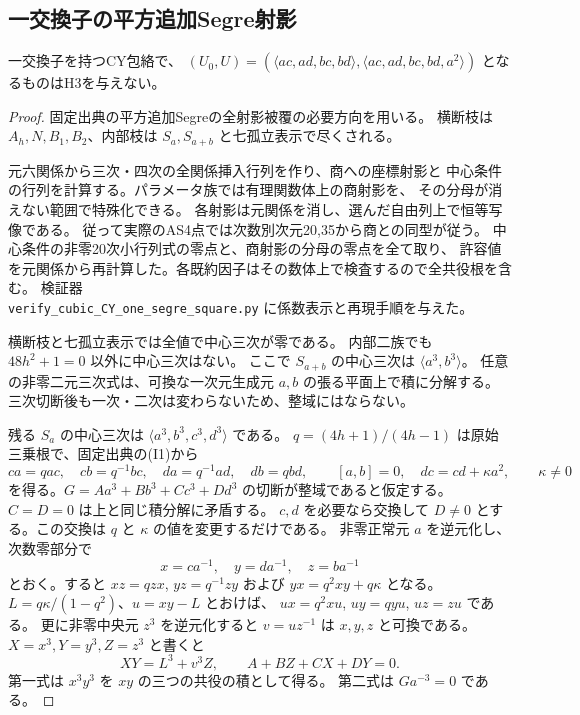 \subsection{一交換子の平方追加Segre射影}
\begin{proposition}\label{prop:cubic-CY-one-segre-square-empty}
一交換子を持つCY包絡で、
$(U_0,U)=(\langle ac,ad,bc,bd\rangle,\langle ac,ad,bc,bd,a^2\rangle)$
となるものはH3を与えない。
\end{proposition}
\begin{proof}
固定出典\cite{AS4CYpinned}の平方追加Segreの全射影被覆の必要方向を用いる。
横断枝は $A_h,N,B_1,B_2$、内部枝は $S_a,S_{a+b}$ と七孤立表示で尽くされる。

元六関係から三次・四次の全関係挿入行列を作り、商への座標射影と
中心条件の行列を計算する。パラメータ族では有理関数体上の商射影を、
その分母が消えない範囲で特殊化できる。
各射影は元関係を消し、選んだ自由列上で恒等写像である。
従って実際のAS4点では次数別次元20,35から商との同型が従う。
中心条件の非零20次小行列式の零点と、商射影の分母の零点を全て取り、
許容値を元関係から再計算した。各既約因子はその数体上で検査するので全共役根を含む。
検証器\\
\texttt{verify\_cubic\_CY\_one\_segre\_square.py}\quad
に係数表示と再現手順を与えた。

横断枝と七孤立表示では全値で中心三次が零である。
内部二族でも $48h^2+1=0$ 以外に中心三次はない。
ここで $S_{a+b}$ の中心三次は $\langle a^3,b^3\rangle$。
任意の非零二元三次式は、可換な一次元生成元 $a,b$ の張る平面上で積に分解する。
三次切断後も一次・二次は変わらないため、整域にはならない。

残る $S_a$ の中心三次は $\langle a^3,b^3,c^3,d^3\rangle$ である。
$q=(4h+1)/(4h-1)$ は原始三乗根で、固定出典の(I1)から
\[
 ca=qac,\quad cb=q^{-1}bc,\quad da=q^{-1}ad,\quad db=qbd,
 \qquad [a,b]=0,\quad dc=cd+\kappa a^2,\qquad \kappa\ne0
\]
を得る。$G=Aa^3+Bb^3+Cc^3+Dd^3$ の切断が整域であると仮定する。
$C=D=0$ は上と同じ積分解に矛盾する。
$c,d$ を必要なら交換して $D\ne0$ とする。この交換は $q$ と $\kappa$ の値を変更するだけである。
非零正常元 $a$ を逆元化し、次数零部分で
\[
 x=ca^{-1},\quad y=da^{-1},\quad z=ba^{-1}
\]
とおく。すると $xz=qzx$, $yz=q^{-1}zy$ および
$yx=q^2xy+q\kappa$ となる。
$L=q\kappa/(1-q^2)$、$u=xy-L$ とおけば、
$ux=q^2xu$, $uy=qyu$, $uz=zu$ である。
更に非零中央元 $z^3$ を逆元化すると $v=uz^{-1}$ は
$x,y,z$ と可換である。
$X=x^3,Y=y^3,Z=z^3$ と書くと
\[
 XY=L^3+v^3 Z,\qquad A+BZ+CX+DY=0.
\]
第一式は $x^3 y^3$ を $xy$ の三つの共役の積として得る。
第二式は $Ga^{-3}=0$ である。


\end{proof}
